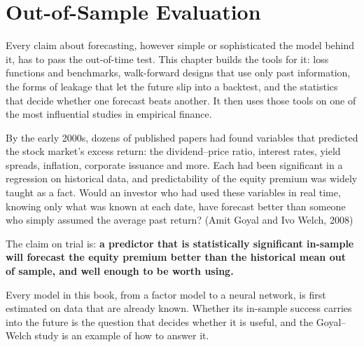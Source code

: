 \makeatletter
{}
\makeatother

\chapter{Out-of-Sample Evaluation}
\label{ch:05}


Every claim about forecasting, however simple or sophisticated the model behind it, has to pass the out-of-time test. This chapter builds the tools for it: loss functions and benchmarks, walk-forward designs that use only past information, the forms of leakage that let the future slip into a backtest, and the statistics that decide whether one forecast beats another. It then uses those tools on one of the most influential studies in empirical finance.

By the early 2000s, dozens of published papers had found variables that predicted the stock market's excess return: the dividend--price ratio, interest rates, yield spreads, inflation, corporate issuance and more. Each had been significant in a regression on historical data, and predictability of the equity premium was widely taught as a fact. Would an investor who had used these variables in real time, knowing only what was known at each date, have forecast better than someone who simply assumed the average past return? (Amit Goyal and Ivo Welch, 2008)

The claim on trial is: \textbf{a predictor that is statistically significant in-sample will forecast the equity premium better than the historical mean out of sample, and well enough to be worth using.}

Every model in this book, from a factor model to a neural network, is first estimated on data that are already known. Whether its in-sample success carries into the future is the question that decides whether it is useful, and the Goyal--Welch study is an example of how to answer it.

